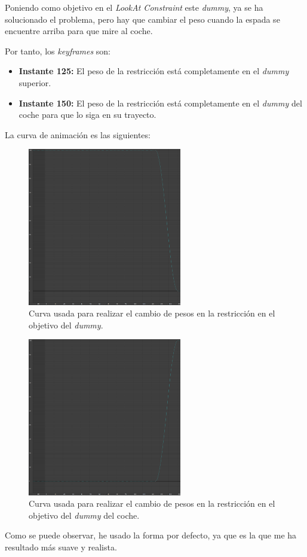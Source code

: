 Poniendo como objetivo en el \textit{LookAt Constraint} este \textit{dummy}, ya se ha solucionado el problema, pero hay que cambiar el peso cuando la espada se encuentre arriba para que mire al coche.

\bigskip

Por tanto, los \textit{keyframes} son:

\begin{itemize}
    \item \textbf{Instante 125: }El peso de la restricción está completamente en el \textit{dummy} superior.
    \item \textbf{Instante 150: }El peso de la restricción está completamente en el \textit{dummy} del coche para que lo siga en su trayecto.
\end{itemize}

\bigskip

\newpage

La curva de animación es las siguientes:

\begin{figure}[H]
    \centering
   \includegraphics[width=0.6\textwidth]{imagenes/espada/lookat0.png}
   \caption{Curva usada para realizar el cambio de pesos en la restricción en el objetivo del \textit{dummy}.}
\end{figure}

\begin{figure}[H]
    \centering
   \includegraphics[width=0.6\textwidth]{imagenes/espada/lookat1.png}
   \caption{Curva usada para realizar el cambio de pesos en la restricción en el objetivo del \textit{dummy} del coche.}
\end{figure}

Como se puede observar, he usado la forma por defecto, ya que es la que me ha resultado más suave y realista.
